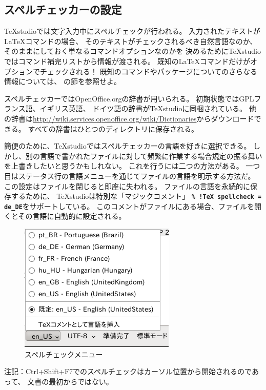 \subsection{スペルチェッカーの設定}

TeXstudioでは文字入力中にスペルチェックが行われる。
入力されたテキストがLaTeXコマンドの場合、
そのテキストがチェックされるべき自然言語なのか、
そのままにしておく単なるコマンドオプションなのかを
決めるためにTeXstudioではコマンド補完リストから情報が渡される。
既知のLaTeXコマンドだけがオプションでチェックされる！
既知のコマンドやパッケージについてのさらなる情報については、
の節を参照せよ。

スペルチェッカーではOpenOffice.orgの辞書が用いられる。
初期状態ではGPLフランス語、イギリス英語、
ドイツ語の辞書がTeXstudioに同梱されている。
他の辞書は\href{http://wiki.services.openoffice.org/wiki/Dictionaries}{http://wiki.services.openoffice.org/wiki/Dictionaries}からダウンロードできる。
すべての辞書はひとつのディレクトリに保存される。

簡便のために、TeXstudioではスペルチェッカーの言語を好きに選択できる。
しかし、別の言語で書かれたファイルに対して頻繁に作業する場合規定の振る舞いを上書きしたいと思うかもしれない。
これを行うには二つの方法がある。
一つ目はステータス行の言語メニューを通じてファイルの言語を明示する方法だ。
この設定はファイルを閉じると即座に失われる。
ファイルの言語を永続的に保存するために、
TeXstudioは特別な「マジックコメント」
\textbf{\texttt{\% !TeX spellcheck = de\_DE}}をサポートしている。
このコメントがファイルにある場合、ファイルを開くとその言語に自動的に設定される。

\begin{figure}[H]
  \centering
  \includegraphics{spellcheck_menu.png}
  \caption{スペルチェックメニュー}
\end{figure}

注記：Ctrl+Shift+F7でのスペルチェックはカーソル位置から開始されるのであって、
文書の最初からではない。
\\

